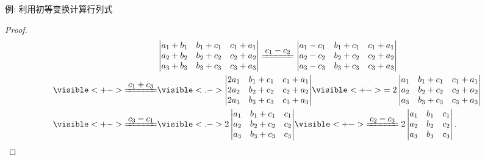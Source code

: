 \begin{frame}{例: 利用初等变换计算行列式}
	\onslide<+->
	\begin{proof}
		\begin{align*}
			&\begin{vmatrix}
				a_1+b_1&b_1+c_1&c_1+a_1\\
				a_2+b_2&b_2+c_2&c_2+a_2\\
				a_3+b_3&b_3+c_3&c_3+a_3
			\end{vmatrix}\xeq{c_1-c_2}\begin{vmatrix}
				a_1-c_1&b_1+c_1&c_1+a_1\\
				a_2-c_2&b_2+c_2&c_2+a_2\\
				a_3-c_3&b_3+c_3&c_3+a_3
			\end{vmatrix}\\
			\visible<+->{\xeq{c_1+c_3}}&\visible<.->{\begin{vmatrix}
				2a_1&b_1+c_1&c_1+a_1\\
				2a_2&b_2+c_2&c_2+a_2\\
				2a_3&b_3+c_3&c_3+a_3
			\end{vmatrix}}
			\visible<+->{=2\begin{vmatrix}
				a_1&b_1+c_1&c_1+a_1\\
				a_2&b_2+c_2&c_2+a_2\\
				a_3&b_3+c_3&c_3+a_3
			\end{vmatrix}}\\
			\visible<+->{\xeq{c_3-c_1}}&\visible<.->{2\begin{vmatrix}
				a_1&b_1+c_1&c_1\\
				a_2&b_2+c_2&c_2\\
				a_3&b_3+c_3&c_3
			\end{vmatrix}}
			\visible<+->{\xeq{c_2-c_3}2\begin{vmatrix}
				a_1&b_1&c_1\\
				a_2&b_2&c_2\\
				a_3&b_3&c_3
			\end{vmatrix}.\qedhere}
		\end{align*}
	\end{proof}
\end{frame}



